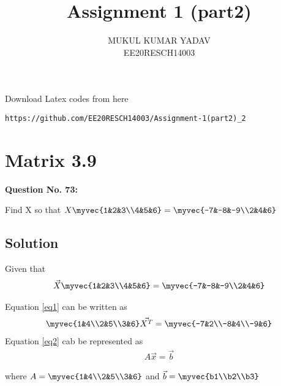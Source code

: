 \documentclass[journal,12pt,twocolumn]{IEEEtran}
\begin{document}
     \def\rightbox#1{\makebox[0in][r]{#1}}
     \def\centbox#1{\makebox[0in]{#1}}
     \def\topbox#1{\raisebox{-\baselineskip}[0in][0in]{#1}}
     \def\midbox#1{\raisebox{-0.5\baselineskip}[0in][0in]{#1}}
\vspace{3cm}
\title{Assignment 1 (part2)}
\author{MUKUL KUMAR YADAV\\ EE20RESCH14003}
\maketitle
\newpage
\bigskip
\renewcommand{\thefigure}{\theenumi}
\renewcommand{\thetable}{\theenumi}
 Download Latex codes from here
\begin{lstlisting}
https://github.com/EE20RESCH14003/Assignment-1(part2)_2
\end{lstlisting}
%

%

%
\section{\textbf{ Matrix 3.9}}
\textbf{Question No. 73:} 

Find X so that $X\myvec{1&2&3\\4&5&6}=\myvec{-7&-8&-9\\2&4&6}$

\subsection{\textbf{Solution}}

Given that 
\begin{align}\label{eq1}
\Vec{X}\myvec{1&2&3\\4&5&6}=\myvec{-7&-8&-9\\2&4&6}
\end{align}

Equation \eqref{eq1} can be written as 
\begin{align}\label{eq2}
\myvec{1&4\\2&5\\3&6}\Vec{X^T}=\myvec{-7&2\\-8&4\\-9&6}
\end{align}
Equation \eqref{eq2} cab be represented as 
\begin{align}\label{eq3}
A\vec{x}=\vec{b}
\end{align}

where $A=\myvec{1&4\\2&5\\3&6}$ and $\vec{b}=\myvec{b1\\b2\\b3}$
\end{document}
